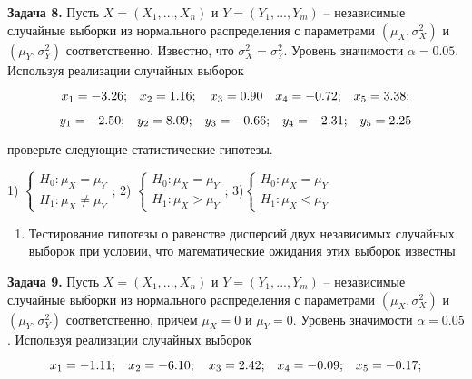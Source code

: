 \textbf{Задача 8.} Пусть $X=\left(X_{1} ,...,X_{n} \right)$ и $Y=\left(Y_{1} ,...,Y_{m} \right)$ -- независимые случайные выборки из нормального распределения с параметрами $\left(\mu _{X} ,\sigma _{X}^{2} \right)$ и $\left(\mu _{Y} ,\sigma _{Y}^{2} \right)$ соответственно. Известно, что $\sigma _{X}^{2} =\sigma _{Y}^{2} $. Уровень значимости $\alpha =0.05$. Используя реализации случайных выборок 

\[x_{1} =-{\rm 3.26;}\quad x_{2} ={\rm 1.16};\quad x_{3} =0.{\rm 9}0\quad x_{4} =-0.{\rm 72;}\quad x_{5} ={\rm 3.38;}\] 

\[y_{1} =-{\rm 2.5}0{\rm ;}\quad y_{2} ={\rm 8.}0{\rm 9;}\quad y_{3} =-0.{\rm 66;}\quad y_{4} =-{\rm 2.31;}\quad y_{5} ={\rm 2.25}\] 

проверьте следующие статистические гипотезы.

1) $\left\{\begin{array}{l} {H_{0} :\mu _{X} =\mu _{Y} } \\ {H_{1} :\mu _{X} \ne \mu _{Y} } \end{array}\right. $;             2) $\left\{\begin{array}{l} {H_{0} :\mu _{X} =\mu _{Y} } \\ {H_{1} :\mu _{X} >\mu _{Y} } \end{array}\right. $;             3)$\left\{\begin{array}{l} {H_{0} :\mu _{X} =\mu _{Y} } \\ {H_{1} :\mu _{X} <\mu _{Y} } \end{array}\right. $



\begin{enumerate}
\item  Тестирование гипотезы о равенстве дисперсий двух независимых случайных выборок при условии, что математические ожидания этих выборок известны 
\end{enumerate}



\textbf{Задача 9.} Пусть $X=\left(X_{1} ,...,X_{n} \right)$ и $Y=\left(Y_{1} ,...,Y_{m} \right)$ -- независимые случайные выборки из нормального распределения с параметрами $\left(\mu _{X} ,\sigma _{X}^{2} \right)$ и $\left(\mu _{Y} ,\sigma _{Y}^{2} \right)$ соответственно, причем $\mu _{X} =0$ и $\mu _{Y} =0$. Уровень значимости $\alpha =0.05$. Используя реализации случайных выборок 

\[x_{1} =-{\rm 1.11;}\quad x_{2} =-{\rm 6.1}0;\quad x_{3} ={\rm 2.42;}\quad x_{4} =-0.0{\rm 9;}\quad x_{5} =-0.{\rm 17;}\] 

